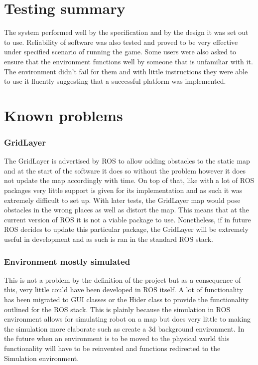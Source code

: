     \section{Testing summary}
      The system performed well by the specification and by the design it was set out to use. Reliability of software was also tested and proved to be very effective under specified scenario of running the game. Some users were also asked to ensure that the environment functions well by someone that is unfamiliar with it. The environment didn't fail for them and with little instructions they were able to use it fluently suggesting that a successful platform was implemented.

    \section{Known problems}
      \subsubsection{GridLayer}
        The GridLayer is advertised by ROS to allow adding obstacles to the static map and at the start of the software it does so without the problem however it does not update the map accordingly with time. On top of that, like with a lot of ROS packages very little support is given for its implementation and as such it was extremely difficult to set up. With later tests, the GridLayer map would pose obstacles in the wrong places as well as distort the map. This means that at the current version of ROS it is not a viable package to use. Nonetheless, if in future ROS decides to update this particular package, the GridLayer will be extremely useful in development and as such is ran in the standard ROS stack.

      \subsubsection{Environment mostly simulated}
        This is not a problem by the definition of the project but as a consequence of this, very little could have been developed in ROS itself. A lot of functionality has been migrated to GUI classes or the Hider class to provide the functionality outlined for the ROS stack. This is plainly because the simulation in ROS environment allows for simulating robot on a map but does very little to making the simulation more elaborate such as create a 3d background environment. In the future when an environment is to be moved to the physical world this functionality will have to be reinvented and functions redirected to the Simulation environment.


